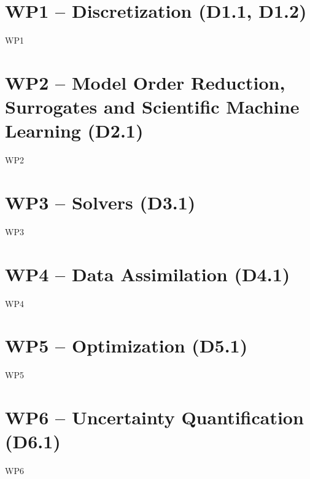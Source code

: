 \chapter{WP1 -- Discretization (D1.1, D1.2)}
\label{chap:wp1}
\clearpage
{WP1}

\chapter{WP2 -- Model Order Reduction, Surrogates and Scientific Machine Learning (D2.1)}
\label{chap:wp2}
\clearpage
{WP2}

\chapter{WP3 -- Solvers (D3.1)}
\label{chap:wp3}
\clearpage
{WP3}

\chapter{WP4 -- Data Assimilation (D4.1)}
\label{chap:wp4}
\clearpage
{WP4}

\chapter{WP5 -- Optimization (D5.1)}
\label{chap:wp5}
\clearpage
{WP5}

\chapter{WP6 -- Uncertainty Quantification (D6.1)}
\label{chap:wp6}
\clearpage
{WP6}

